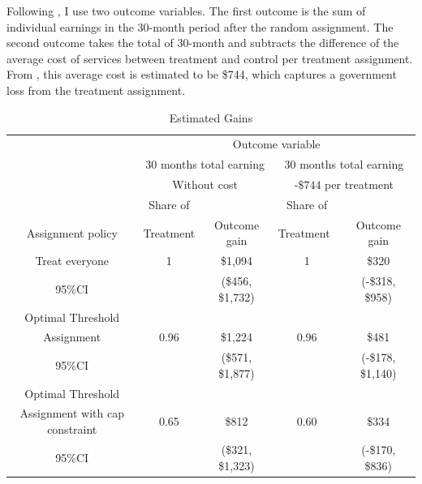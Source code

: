\documentclass[12pt,oneside,reqno,english]{amsart}
\theoremstyle{definition}
\begin{document}
Following \cite{KT:18}, I use two outcome variables. The first outcome is the sum of individual earnings in the 30-month period after the random assignment. The second outcome takes the total of 30-month and subtracts the difference of the average cost of services between treatment and control per treatment assignment. From \cite{Bloom:97}, this average cost is estimated to be \$744, which captures a government loss from the treatment assignment. 

\begin{table}[t]
\vspace{0.5cm}
\begin{tabular}{c|cccc|}
  &\multicolumn{4}{c}{Outcome variable} \tabularnewline
  & \multicolumn{2}{c}{30 months total earning} & \multicolumn{2}{c|}{30 months total earning} \tabularnewline
  & \multicolumn{2}{c}{Without cost} & \multicolumn{2}{c|}{-$\$744$ per treatment} \tabularnewline
  &  Share of  &                         & Share of         &    \tabularnewline
Assignment policy & Treatment  & Outcome gain & Treatment\ & Outcome gain   \tabularnewline
\hline
Treat everyone & 1 &  \$1,094      &  1 & \$320    \tabularnewline
95\%CI     &    &(\$456, \$1,732)    &    &(-\$318, \$958)    \tabularnewline
\hline
Optimal Threshold   &         &    &              &                       \tabularnewline
Assignment & 0.96 &  \$1,224      & 0.96  & \$481     \tabularnewline
  95\%CI &    &(\$571, \$1,877)  &   &(-\$178, \$1,140)  \tabularnewline
\hline 
Optimal Threshold    &         &    &              &                       \tabularnewline
Assignment with cap constraint& 0.65 &  \$812      & 0.60  & \$334     \tabularnewline
  95\%CI &    &(\$321, \$1,323)  &   &(-\$170, \$836)  \tabularnewline
\hline 
\end{tabular}
\vspace{0.5cm}
\caption{Estimated Gains}\label{t:gains}
\end{table}
\end{document}
